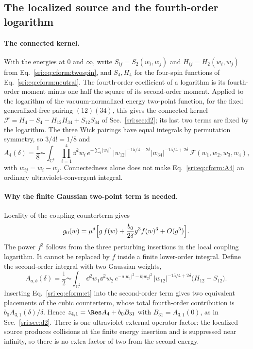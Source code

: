 \subsection{The localized source and the fourth-order logarithm}\label{sri:app:cform:source}
\paragraph{The connected kernel.} With the energies at $0$ and $\infty$, write $S_{ij}=S_2(w_i,w_j)$ and
$H_{ij}=H_2(w_i,w_j)$ from Eq.~\eqref{sri:eq:cform:twospin}, and $S_4,H_4$ for the four-spin functions of
Eq.~\eqref{sri:eq:cform:neutral}. The fourth-order coefficient of a logarithm is its fourth-order moment minus one half
the square of its second-order moment. Applied to the logarithm of the vacuum-normalized energy two-point function,
for the fixed generalized-free pairing $(12)(34)$, this gives the connected kernel
$\mathcal F=H_4-S_4-H_{12}H_{34}+S_{12}S_{34}$ of Sec.~\ref{sri:sec:d2}; its last two terms are fixed by the logarithm.
The three Wick pairings have equal integrals by permutation symmetry, so $3/4!=1/8$ and
\begin{equation}
 A_4(\delta)=\frac18\AC\!\int_{\mathbb C^4}\prod_{i=1}^4\dd^2w_i\,e^{-\sum_i|w_i|^2}\,
 |w_{12}|^{-15/4+2\delta}|w_{34}|^{-15/4+2\delta}\,\mathcal F(w_1,w_2,w_3,w_4),
 \label{sri:eq:cform:A4}
\end{equation}
with $w_{ij}=w_i-w_j$. Connectedness alone does not make Eq.~\eqref{sri:eq:cform:A4} an ordinary ultraviolet-convergent
integral.

\paragraph{Why the finite Gaussian two-point term is needed.} Locality of the coupling counterterm gives
\begin{equation}
 g_0(w)=\mu^\delta\Bigl[g\,f(w)+\frac{b_0}{2\delta}g^3f(w)^3+O(g^5)\Bigr].
 \label{sri:eq:cform:ct}
\end{equation}
The power $f^3$ follows from the three perturbing insertions in the local coupling logarithm. It cannot be replaced by
$f$ inside a finite lower-order integral. Define the second-order integral with two Gaussian weights,
\begin{equation}
 A_{a,b}(\delta)=\frac12\AC\!\int_{\mathbb C^2}\dd^2w_1\dd^2w_2\,e^{-a|w_1|^2-b|w_2|^2}\,
 |w_{12}|^{-15/4+2\delta}\bigl(H_{12}-S_{12}\bigr).
 \label{sri:eq:cform:Aab}
\end{equation}
Inserting Eq.~\eqref{sri:eq:cform:ct} into the second-order term gives two equivalent placements of the cubic
counterterm, whose total fourth-order contribution is $b_0A_{3,1}(\delta)/\delta$. Hence $z_{4,1}=\Res A_4+b_0B_{31}$
with $B_{31}=A_{3,1}(0)$, as in Sec.~\ref{sri:sec:d2}. There is one ultraviolet external-operator factor: the localized
source produces collisions at the finite energy insertion and is suppressed near infinity, so there is no extra
factor of two from the second energy.


